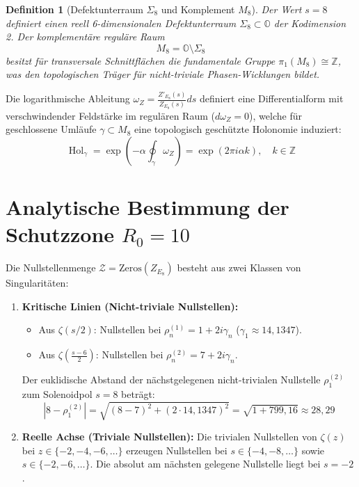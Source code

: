 \documentclass[11pt,a4paper]{article}
\newtheorem{definition}{Definition}
\begin{document}
\begin{definition}[Defektunterraum $\Sigma_8$ und Komplement $M_8$]
Der Wert $s=8$ definiert einen reell 6-dimensionalen Defektunterraum $\Sigma_8 \subset \mathbb{O}$ der Kodimension 2. Der komplementäre reguläre Raum 
\begin{equation}
M_8 = \mathbb{O} \setminus \Sigma_8
\end{equation}
besitzt für transversale Schnittflächen die fundamentale Gruppe $\pi_1(M_8) \cong \mathbb{Z}$, was den topologischen Träger für nicht-triviale Phasen-Wicklungen bildet.
\end{definition}

Die logarithmische Ableitung $\omega_Z = \frac{Z'_{E_8}(s)}{Z_{E_8}(s)} ds$ definiert eine Differentialform mit verschwindender Feldstärke im regulären Raum ($d\omega_Z = 0$), welche für geschlossene Umläufe $\gamma \subset M_8$ eine topologisch geschützte Holonomie induziert:
\begin{equation}
\operatorname{Hol}_\gamma = \exp\left( -\alpha \oint_\gamma \omega_Z \right) = \exp(2\pi i \alpha k), \quad k \in \mathbb{Z}
\end{equation}

\section{Analytische Bestimmung der Schutzzone $R_0 = 10$}

Die Nullstellenmenge $\mathcal{Z} = \mathrm{Zeros}(Z_{E_8})$ besteht aus zwei Klassen von Singularitäten:
\begin{enumerate}
    \item \textbf{Kritische Linien (Nicht-triviale Nullstellen):} 
    \begin{itemize}
        \item Aus $\zeta(s/2)$: Nullstellen bei $\rho_n^{(1)} = 1 + 2i\gamma_n$ ($\gamma_1 \approx 14{,}1347$).
        \item Aus $\zeta(\frac{s-6}{2})$: Nullstellen bei $\rho_n^{(2)} = 7 + 2i\gamma_n$.
    \end{itemize}
    Der euklidische Abstand der nächstgelegenen nicht-trivialen Nullstelle $\rho_1^{(2)}$ zum Solenoidpol $s=8$ beträgt:
    \begin{equation}
    |8 - \rho_1^{(2)}| = \sqrt{(8-7)^2 + (2 \cdot 14{,}1347)^2} = \sqrt{1 + 799{,}16} \approx 28{,}29
    \end{equation}

    \item \textbf{Reelle Achse (Triviale Nullstellen):}
    Die trivialen Nullstellen von $\zeta(z)$ bei $z \in \{-2, -4, -6, \dots\}$ erzeugen Nullstellen bei $s \in \{-4, -8, \dots\}$ sowie $s \in \{-2, -6, \dots\}$. 
    Die absolut am nächsten gelegene Nullstelle liegt bei $s = -2$.
\end{enumerate}
\end{document}
